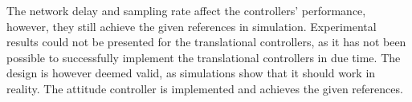 The network delay and sampling rate affect the controllers' performance, however, they still achieve the given references in simulation. Experimental results could not be presented for the translational controllers, as it has not been possible to successfully implement the translational controllers in due time. The design is however deemed valid, as simulations show that it should work in reality. The attitude controller is implemented and achieves the given references. 
%
